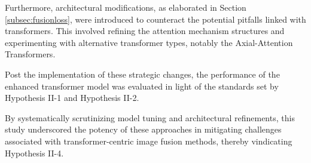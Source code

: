Furthermore, architectural modifications, as elaborated in Section \ref{subsec:fusionloss}, were introduced to counteract the potential pitfalls linked with transformers. This involved refining the attention mechanism structures and experimenting with alternative transformer types, notably the Axial-Attention Transformers.

Post the implementation of these strategic changes, the performance of the enhanced transformer model was evaluated in light of the standards set by Hypothesis II-1 and Hypothesis II-2.

By systematically scrutinizing model tuning and architectural refinements, this study underscored the potency of these approaches in mitigating challenges associated with transformer-centric image fusion methods, thereby vindicating Hypothesis II-4.
